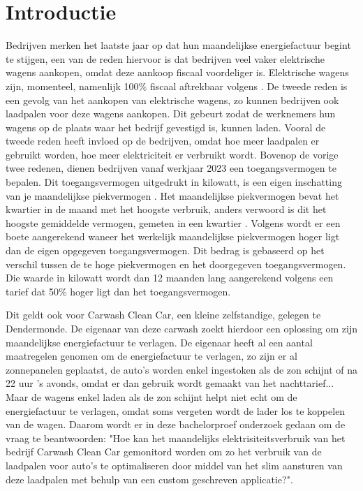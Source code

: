 
\section{Introductie}%
\label{sec:introductie}

Bedrijven merken het laatste jaar op dat hun maandelijkse energiefactuur begint te stijgen, een van de reden hiervoor is dat bedrijven veel vaker elektrische wagens aankopen, omdat deze aankoop fiscaal voordeliger is. Elektrische wagens zijn, momenteel, namenlijk 100\% fiscaal aftrekbaar volgens \textcite{Blomme2023}. De tweede reden is een gevolg van het aankopen van elektrische wagens, zo kunnen bedrijven ook laadpalen voor deze wagens aankopen. Dit gebeurt zodat de werknemers hun wagens op de plaats waar het bedrijf gevestigd is, kunnen laden. Vooral de tweede reden heeft invloed op de bedrijven, omdat hoe meer laadpalen er gebruikt worden, hoe meer elektriciteit er verbruikt wordt. Bovenop de vorige twee redenen, dienen bedrijven vanaf werkjaar 2023 een toegangsvermogen te bepalen. Dit toegangsvermogen uitgedrukt in kilowatt, is een eigen inschatting van je maandelijkse piekvermogen \autocite{Fluvius2022}. Het maandelijkse piekvermogen bevat het kwartier in de maand met het hoogste verbruik, anders verwoord is dit het hoogste gemiddelde vermogen, gemeten in een kwartier \autocite{Fluvius2022}. Volgens \textcite{Fluvius2022} wordt er een boete aangerekend waneer het werkelijk maandelijkse piekvermogen hoger ligt dan de eigen opgegeven toegangsvermogen. Dit bedrag is gebaseerd op het verschil tussen de te hoge piekvermogen en het doorgegeven toegangsvermogen. Die waarde in kilowatt wordt dan 12 maanden lang aangerekend volgens een tarief dat 50\% hoger ligt dan het toegangsvermogen.

Dit geldt ook voor Carwash Clean Car, een kleine zelfstandige, gelegen te Dendermonde. De eigenaar van deze carwash zoekt hierdoor een oplossing om zijn maandelijkse energiefactuur te verlagen. De eigenaar heeft al een aantal maatregelen genomen om de energiefactuur te verlagen, zo zijn er al zonnepanelen geplaatst, de auto's worden enkel ingestoken als de zon schijnt of na 22 uur 's avonds, omdat er dan gebruik wordt gemaakt van het nachttarief... Maar de wagens enkel laden als de zon schijnt helpt niet echt om de energiefactuur te verlagen, omdat soms vergeten wordt de lader los te koppelen van de wagen. Daarom wordt er in deze bachelorproef onderzoek gedaan om de vraag te beantwoorden: "Hoe kan het maandelijks elektrisiteitsverbruik van het bedrijf Carwash Clean Car gemonitord worden om zo het verbruik van de laadpalen voor auto's te optimaliseren door middel van het slim aansturen van deze laadpalen met behulp van een custom geschreven applicatie?".

